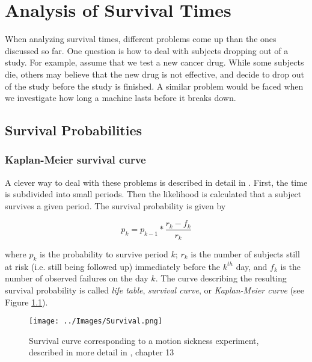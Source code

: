 \chapter{Analysis of Survival Times} 

When analyzing survival times, different problems come up than the ones discussed so far. One question is how to deal with subjects dropping out of a study. For example, assume that we test a new cancer drug. While some subjects die, others may believe that the new drug is not effective, and decide to drop out of the study before the study is finished.
A similar problem would be faced when we investigate how long a machine lasts before it breaks down.

\section{Survival Probabilities}

\subsection{Kaplan-Meier survival curve} 

A clever way to deal with these problems is described in detail in \cite{altman99}. First, the time is subdivided into small periods. Then the likelihood is calculated that a subject survives a given period. The survival probability is given by

\begin{equation}
  p_k = p_{k-1} * \frac{r_k-f_k}{r_k}
\end{equation}

where $p_k$ is the probability to survive period $k$; $r_k$ is the number of subjects still at risk (i.e. still being followed up) immediately before the $k^{th}$ day, and $f_k$ is the number of observed failures on the day $k$. The curve describing the resulting survival probability is called \emph{life table}, \emph{survival curve}, or \emph{Kaplan-Meier curve} (see Figure \ref{fig:SurvivalCurve}).

\begin{figure}
  \centering
  \texttt{[image: ../Images/Survival.png]}\\
  \caption{Survival curve corresponding to a motion sickness experiment, described in more detail in \cite{altman99}, chapter 13}\label{fig:SurvivalCurve}
\end{figure}

